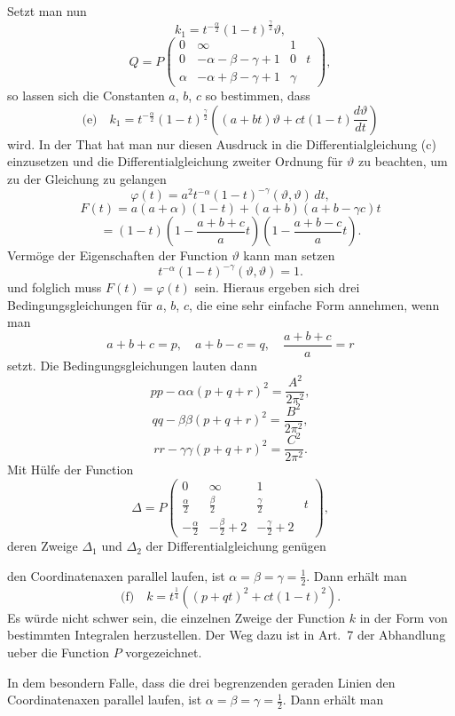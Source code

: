 \documentclass[12pt,a4paper]{article}
\begin{document}
\newpage
Setzt man nun
\[k_{1} = t^{-\frac{\alpha}{2}} (1-t)^{\frac{\gamma}{2}} \vartheta,\]
\[Q = P \begin{pmatrix} 0 & \infty & 1 \\ 0 & -\alpha-\beta-\gamma+1 & 0 & t \\ \alpha & -\alpha+\beta-\gamma+1 & \gamma \end{pmatrix},\]
so lassen sich die Constanten $a$, $b$, $c$ so bestimmen, dass
\[\text{(e)} \quad k_{1} = t^{-\frac{\alpha}{2}} (1-t)^{\frac{\gamma}{2}} \left((a+bt)\vartheta + ct(1-t) \frac{d\vartheta}{dt}\right)\]
wird. In der That hat man nur diesen Ausdruck in die Differentialgleichung (c) einzusetzen und die Differentialgleichung zweiter Ordnung f\"ur $\vartheta$ zu beachten, um zu der Gleichung zu gelangen
\[\varphi(t) = a^{2} t^{-\alpha} (1-t)^{-\gamma} (\vartheta, \vartheta)\, dt,\]
\[F(t) = a(a+\alpha)(1-t) + (a+b)(a+b-\gamma c)t\]
\[= (1-t)\left(1 - \frac{a+b+c}{a}t\right)\left(1 - \frac{a+b-c}{a}t\right).\]
Verm\"oge der Eigenschaften der Function $\vartheta$ kann man setzen
\[t^{-\alpha}(1-t)^{-\gamma}(\vartheta, \vartheta) = 1.\]
und folglich muss $F(t) = \varphi(t)$ sein. Hieraus ergeben sich drei Bedingungsgleichungen f\"ur $a$, $b$, $c$, die eine sehr einfache Form annehmen, wenn man
\[a+b+c = p, \quad a+b-c = q, \quad \frac{a+b+c}{a} = r\]
setzt. Die Bedingungsgleichungen lauten dann
\[pp - \alpha\alpha(p+q+r)^{2} = \frac{A^{2}}{2\pi^{2}},\]
\[qq - \beta\beta(p+q+r)^{2} = \frac{B^{2}}{2\pi^{2}},\]
\[rr - \gamma\gamma(p+q+r)^{2} = \frac{C^{2}}{2\pi^{2}}.\]
Mit H\"ulfe der Function
\[\varDelta = P \begin{pmatrix} 0 & \infty & 1 \\ \frac{\alpha}{2} & \frac{\beta}{2} & \frac{\gamma}{2} & t \\ -\frac{\alpha}{2} & -\frac{\beta}{2}+2 & -\frac{\gamma}{2}+2 \end{pmatrix},\]
deren Zweige $\varDelta_{1}$ und $\varDelta_{2}$ der Differentialgleichung gen\"ugen

\newpage
\noindent den Coordinatenaxen parallel laufen, ist $\alpha = \beta = \gamma = \frac{1}{2}$. Dann erh\"alt man
\[\text{(f)} \quad k = t^{\frac{1}{4}} \left((p+qt)^{2} + ct(1-t)^{2}\right).\]
Es w\"urde nicht schwer sein, die einzelnen Zweige der Function $k$ in der Form von bestimmten Integralen herzustellen. Der Weg dazu ist in Art.~7 der Abhandlung ueber die Function $P$ vorgezeichnet.

In dem besondern Falle, dass die drei begrenzenden geraden Linien den Coordinatenaxen parallel laufen, ist $\alpha = \beta = \gamma = \frac{1}{2}$. Dann erh\"alt man
\end{document}
